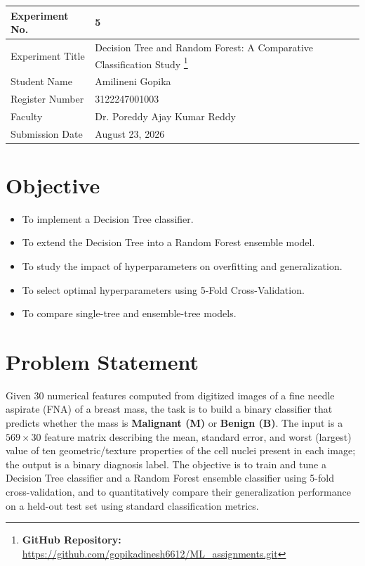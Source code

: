 \documentclass[12pt,a4paper]{article}
\begin{document}
\begin{tabular}{|p{4cm}|p{11cm}|}
\hline
Experiment No. & 5 \\ \hline
Experiment Title & Decision Tree and Random Forest: A Comparative Classification Study
\footnote{\textbf{GitHub Repository: }\url{https://github.com/gopikadinesh6612/ML_assignments.git}}\\ \hline
Student Name & Amilineni Gopika \\ \hline
Register Number & 3122247001003 \\ \hline
Faculty & Dr. Poreddy Ajay Kumar Reddy \\ \hline
Submission Date & August 23, 2026\\ \hline
\end{tabular}

\section{Objective}
\begin{itemize}
\item To implement a Decision Tree classifier.
\item To extend the Decision Tree into a Random Forest ensemble model.
\item To study the impact of hyperparameters on overfitting and generalization.
\item To select optimal hyperparameters using 5-Fold Cross-Validation.
\item To compare single-tree and ensemble-tree models.
\end{itemize}

\section{Problem Statement}
Given 30 numerical features computed from digitized images of a fine needle aspirate (FNA) of a
breast mass, the task is to build a binary classifier that predicts whether the mass is
\textbf{Malignant (M)} or \textbf{Benign (B)}. The input is a $569 \times 30$ feature matrix
describing the mean, standard error, and worst (largest) value of ten geometric/texture properties
of the cell nuclei present in each image; the output is a binary diagnosis label. The objective is
to train and tune a Decision Tree classifier and a Random Forest ensemble classifier using 5-fold
cross-validation, and to quantitatively compare their generalization performance on a held-out test
set using standard classification metrics.
\end{document}
